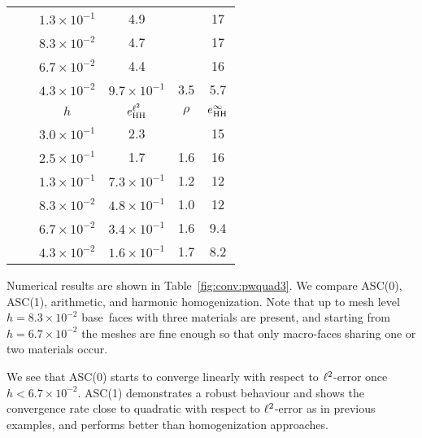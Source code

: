 \begin{table}[h]
\begin{tabular}[1.1]{c | c | c || c | c || c |}
	    \cline{3-6}
	    & & $1.3\times10^{-1}$ & 4.9 & & 17 \\
	    \cline{3-6}
	    & & $8.3\times10^{-2}$ & 4.7 & & 17 \\
	    \cline{3-6}
	    & & {$6.7\times10^{-2}$} & 4.4 & & 16 \\
	    \cline{3-6}
	    & & $4.3\times10^{-2}$ & $9.7\times10^{-1}$ & 3.5 & 5.7 \\
	    \hhline{~=====}
	    & \multirow{7}{*}{\rotatebox{90}{Harmonic}} & $h$ & $e^{{\ell^2}}_{\text{HH}}$ & $\rho$ & $e^{\infty}_{\text{HH}}$ \\
	    \cline{3-6}
	    & & $3.0\times10^{-1}$ & 2.3 & & 15 \\
	    \cline{3-6}
	    & & $2.5\times10^{-1}$ & 1.7 & 1.6 & 16 \\
	    \cline{3-6}
	    & & $1.3\times10^{-1}$ & $7.3\times10^{-1}$ & 1.2 & 12 \\
	    \cline{3-6}
	    & & $8.3\times10^{-2}$ & $4.8\times10^{-1}$ & 1.0 & 12 \\
	    \cline{3-6}
	    & & $6.7\times10^{-2}$ & $3.4\times10^{-1}$ & 1.6 & 9.4 \\
	    \cline{3-6}
	    & & $4.3\times10^{-2}$ & $1.6\times10^{-1}$ & 1.7 & 8.2 \\
	    \cline{2-6}
	  \end{tabular}

	\end{table}
	
	Numerical results are shown in Table~\ref{fig:conv:pwquad3}.
        We compare ASC(0), ASC(1), arithmetic, and harmonic homogenization.
        Note that up to mesh level~$h = 8.3\times10^{-2}$ base\,
        faces with three materials are present, and starting from %
        {$h = 6.7\times10^{-2}$} the meshes are fine
        enough so that only   macro-faces sharing one or two materials occur.
	
	We see that ASC(0) starts to converge linearly with respect to ${\ell^2}$-error
        once~$h < 6.7\times10^{-2}$. ASC(1) demonstrates a robust behaviour and shows the convergence
        rate close to quadratic with respect to ${\ell^2}$-error as in previous examples,
        and performs better than homogenization approaches.



